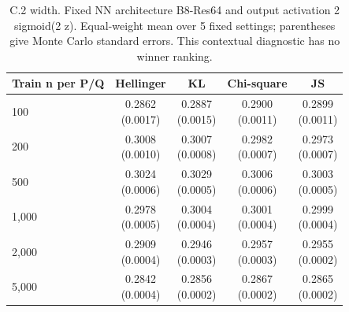 \begin{table}[t]
\centering
\small
\setlength{\tabcolsep}{4pt}
\caption{C.2 width. Fixed NN architecture B8-Res64 and output activation 2 sigmoid(2 z). Equal-weight mean over 5 fixed settings; parentheses give Monte Carlo standard errors. This contextual diagnostic has no winner ranking.}
\label{tab:sim-c-2-width}
\begin{tabular}{lcccc}
\toprule
Train n per P/Q & Hellinger & KL & Chi-square & JS \\
\midrule
100 & \shortstack{0.2862\\(0.0017)} & \shortstack{0.2887\\(0.0015)} & \shortstack{0.2900\\(0.0011)} & \shortstack{0.2899\\(0.0011)} \\
200 & \shortstack{0.3008\\(0.0010)} & \shortstack{0.3007\\(0.0008)} & \shortstack{0.2982\\(0.0007)} & \shortstack{0.2973\\(0.0007)} \\
500 & \shortstack{0.3024\\(0.0006)} & \shortstack{0.3029\\(0.0005)} & \shortstack{0.3006\\(0.0006)} & \shortstack{0.3003\\(0.0005)} \\
1,000 & \shortstack{0.2978\\(0.0005)} & \shortstack{0.3004\\(0.0004)} & \shortstack{0.3001\\(0.0004)} & \shortstack{0.2999\\(0.0004)} \\
2,000 & \shortstack{0.2909\\(0.0004)} & \shortstack{0.2946\\(0.0003)} & \shortstack{0.2957\\(0.0003)} & \shortstack{0.2955\\(0.0002)} \\
5,000 & \shortstack{0.2842\\(0.0004)} & \shortstack{0.2856\\(0.0002)} & \shortstack{0.2867\\(0.0002)} & \shortstack{0.2865\\(0.0002)} \\
\bottomrule
\end{tabular}
\end{table}

